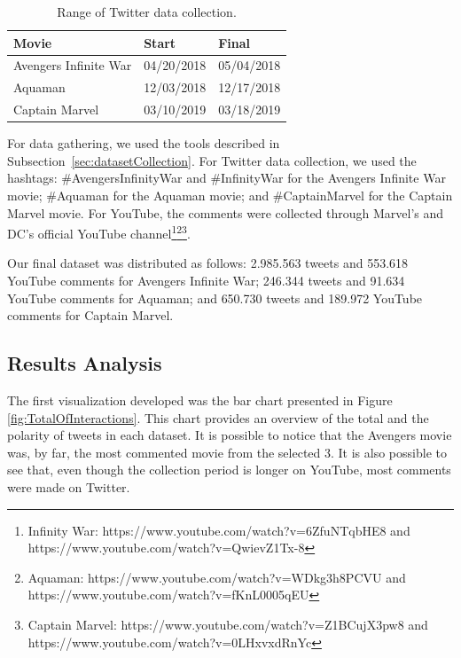 \begin{table}[h]
    \small{}
    \begin{tabular}{ p{4cm}|p{1.5cm}|p{1.5cm} }
        \hline
            \textbf{Movie} & \textbf{Start} & \textbf{Final}\\
        \hline
            Avengers Infinite War & 04/20/2018  & 05/04/2018 \\
            Aquaman & 12/03/2018 & 12/17/2018  \\
            Captain Marvel & 03/10/2019 & 03/18/2019 \\
        \hline
    \end{tabular}
    \caption{Range of  Twitter data collection.}
    \label{tab:range_data}
\end{table}


For data gathering, we used the tools described in Subsection~\ref{sec:datasetCollection}. For Twitter data collection, we used the hashtags: \#AvengersInfinityWar and \#InfinityWar for the Avengers Infinite War movie; \#Aquaman for the Aquaman movie; and \#CaptainMarvel for the Captain Marvel movie. For YouTube, the comments were collected through Marvel's and DC's official YouTube channel\footnote{Infinity War: https://www.youtube.com/watch?v=6ZfuNTqbHE8 and https://www.youtube.com/watch?v=QwievZ1Tx-8}\footnote{Aquaman: https://www.youtube.com/watch?v=WDkg3h8PCVU and https://www.youtube.com/watch?v=fKnL0005qEU}\footnote{Captain Marvel: https://www.youtube.com/watch?v=Z1BCujX3pw8 and https://www.youtube.com/watch?v=0LHxvxdRnYc}.

Our final dataset was distributed as follows: 2.985.563 tweets and 553.618 YouTube comments for Avengers Infinite War; 246.344 tweets and 91.634 YouTube comments for Aquaman; and 650.730 tweets and 189.972 YouTube comments for Captain Marvel. 



\subsection{Results Analysis}

The first visualization developed was the bar chart presented in Figure \ref{fig:TotalOfInteractions}. This chart provides an overview of the total and the polarity of tweets in each dataset. It is possible to notice that the Avengers movie was, by far, the most commented movie from the selected 3. It is also possible to see that, even though the collection period is longer on YouTube, most comments were made on Twitter.

